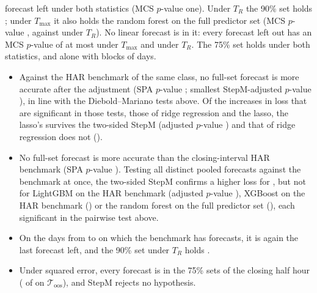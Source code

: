 \begin{itemize}
    forecast left under both statistics (MCS $p$-value one). Under $T_R$ the 90\% set holds
    \rhmcsOosQlikeTrangeSetNinety; under $T_{\max}$ it also holds the random forest on the full predictor set (MCS
    $p$-value \rhmcsOosQlikeTmaxPRfFull, against \rhmcsOosQlikeTrangePRfFull{} under $T_R$). No linear forecast is in
    it: every forecast left out has an MCS $p$-value of at most \rhmcsOosQlikeTmaxPMaxOutNinety{} under $T_{\max}$ and
    \rhmcsOosQlikeTrangePMaxOutNinety{} under $T_R$. The 75\% set holds \rhmcsOosQlikeTmaxSetSevenFive{} under both
    statistics, and \rhmcsOosQlikeTmaxSetSevenFiveHi{} alone with blocks of \rhmcsBlockHi{} days.
    \begin{itemize}
    \item Against the HAR benchmark of the same class, no full-set forecast is more accurate after the adjustment
      (SPA $p$-value \rhmcsOosQAfSpaC; smallest StepM-adjusted $p$-value \rhmcsOosQAfPMin), in line with the
      Diebold--Mariano tests above. Of the increases in loss that are significant in those tests, those of ridge
      regression and the lasso, the lasso's survives the two-sided StepM (adjusted $p$-value \rhmcsOosQAfPTwoLasso)
      and that of ridge regression does not (\rhmcsOosQAfPTwoRidge).
    \item No full-set forecast is more accurate than the closing-interval HAR benchmark (SPA $p$-value
      \rhmcsOosQBmSpaC). Testing all \rhmcsNModelsWord{} distinct pooled forecasts against the benchmark at once, the
      two-sided StepM confirms a higher loss for \rhmcsOosQBmAllRejTwo, but not for LightGBM on the HAR benchmark
      (adjusted $p$-value \rhmcsOosQBmAllPTwoLgbmHar), XGBoost on the HAR benchmark (\rhmcsOosQBmAllPTwoXgbHar) or
      the random forest on the full predictor set (\rhmcsOosQBmAllPTwoRfFull), each significant in the pairwise test
      above.
    \item On the \rhmcsDaysCh{} days from \rhmcsChStart{} to \rhorSpanEnd{} on which the benchmark has forecasts, it
      is again the last forecast left, and the 90\% set under $T_R$ holds \rhmcsChQlikeTrangeSetNinety.
    \item Under squared error, every forecast is in the 75\% sets of the closing half hour
      (\rhmcsOosMseTmaxNSevenFive{} of \rhmcsNModelsBench{} on $\mathcal T_{\mathrm{oos}}$), and StepM rejects no
      hypothesis.
    \end{itemize}
  \end{itemize}

